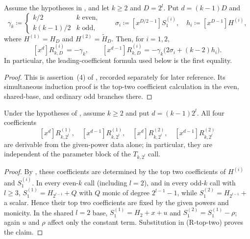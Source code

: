 \begin{lemma}\label{lem:Rk2l-leading-coeff}
    Assume the hypotheses in , and let $k\ge2$ and
    $D=2^l$.  Put $d=(k-1)D$ and
    \[
      \gamma_k\coloneqq
      \begin{cases}k/2&k\text{ even},\\ k(k-1)/2&k\text{ odd},\end{cases}
      \qquad
      \sigma_i\coloneqq [x^{D/2-1}]S^{(i)}_1,\quad
      h_i\coloneqq [x^{D-1}]H^{(i)},
    \]
    where $H^{(1)}=H_D$ and $H^{(2)}=\widetilde H_D$.  Then, for $i=1,2$,
    \[
      [x^d]R^{(i)}_{k,D}=-\gamma_k,
      \qquad
      [x^{d-1}]R^{(i)}_{k,D}
        =-\gamma_k\bigl(2\sigma_i+(k-2)h_i\bigr).
      \tag{R-top-two}
    \]
    In particular, the leading-coefficient formula used below is the first
    equality.
\end{lemma}
\begin{proof}
    This is assertion~(4) of , recorded separately for later
    reference.  Its simultaneous induction proof is the top-two coefficient
    calculation in the even, shared-base, and ordinary odd branches there.
\end{proof}

\begin{lemma}\label{lem:Rk2l-top-boundary}
    Under the hypotheses of , assume $k\ge2$ and put
    $d=(k-1)2^l$.
    All four coefficients
    \[
      [x^d]R^{(1)}_{k,2^l},\quad [x^{d-1}]R^{(1)}_{k,2^l},\quad
      [x^d]R^{(2)}_{k,2^l},\quad [x^{d-1}]R^{(2)}_{k,2^l}
    \]
    are derivable from the given-power data alone; in particular, they are
    independent of the parameter block of the $T_{k,2^l}$ call.
\end{lemma}
\begin{proof}
    By , these coefficients are determined by
    the top two coefficients of $H^{(i)}$ and $S^{(i)}_1$.  In every even-$k$
    call (including $l=2$), and in every odd-$k$ call with $l\ge3$,
    $S^{(1)}_1=H_{2^{l-1}}+Q$ with $Q$ monic of degree
    $2^{l-1}-1$, while $S^{(2)}_1=H_{2^{l-1}}+$ a scalar.  Hence their top
    two coefficients are fixed by the given powers and monicity.  In the
    shared $l=2$ base, $S^{(1)}_1=H_2+x+u$ and
    $S^{(2)}_1=S^{(1)}_1-\rho$; again $u$ and $\rho$ affect only the constant
    term.  Substitution in (R-top-two) proves the claim.
\end{proof}

